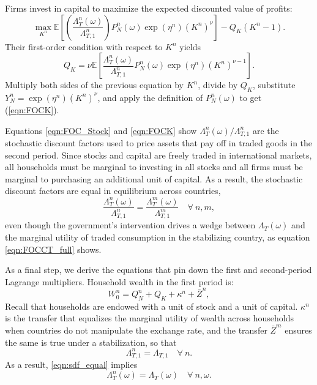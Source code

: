 Firms invest in capital to maximize the expected discounted value of
profits:
\begin{equation*}
  \max_{K^n} \mathbb{E}\left[ 
    \left( \frac{\Lambda^n_T(\omega)}{\Lambda^n_{T, 1}} \right) 
    P_N^n(\omega) \exp\left( \eta^n \right) \left( K^n \right)^{\nu} \right] - 
  Q_K \left( K^n - 1 \right).
\end{equation*}
Their first-order condition with respect to $K^n$
yields\begin{equation*} Q_K = \nu \mathbb{E}\left[
    \frac{\Lambda_T^n(\omega)}{\Lambda_{T, 1}^n} P^n_N(\omega)
    \exp\left( \eta^n \right) \left(K^n\right)^{\nu - 1} \right].
\end{equation*}
Multiply both sides of the previous equation by $K^n$, divide by
$Q_K$, substitute $Y_N^n = \exp(\eta^n) \left( K^n \right)^\nu$, and
apply the definition of $P^n_N(\omega)$ to get (\ref{eqn:FOCK}).

Equations \eqref{eqn:FOC_Stock} and \eqref{eqn:FOCK} show
$\Lambda^n_T(\omega) / \Lambda^n_{T, 1}$ are the stochastic discount
factors used to price assets that pay off in traded goods in the
second period. Since stocks and capital are freely traded in
international markets, all households must be marginal to investing in
all stocks and all firms must be marginal to purchasing an additional
unit of capital. As a result, the stochastic discount factors are
equal in equilibrium across countries,
\begin{equation}
  \frac{\Lambda^n_T(\omega)}{\Lambda^n_{T, 1}} = 
  \frac{\Lambda^m_T(\omega)}{\Lambda^m_{T, 1}} \quad
  \forall ~n, m,
  \label{eqn:sdf_equal}
\end{equation}
even though the government's intervention drives a wedge between
$\Lambda_T(\omega)$ and the marginal utility of traded consumption in
the stabilizing country, as equation \eqref{eqn:FOCCT_full} shows.

As a final step, we derive the equations that pin down the first and
second-period Lagrange multipliers. Household wealth in the first
period is:
\begin{equation*}
  W^n_0 = Q^n_N + Q_K + \kappa^n + \bar{Z}^n,
\end{equation*}
Recall that households are endowed with a unit of stock and a unit of
capital. $\kappa^n$ is the transfer that equalizes the marginal
utility of wealth across households when countries do not manipulate
the exchange rate, and the transfer $\bar{Z}^m$ ensures the same is
true under a stabilization, so that\begin{equation} \Lambda^{n}_{T, 1}
  = \Lambda^{}_{T, 1} \quad \forall ~n.
  \label{eqn:mult_equal}
\end{equation}
As a result, \eqref{eqn:sdf_equal} implies
\begin{equation*}
  \Lambda^n_T(\omega) = \Lambda_T(\omega)
  \quad \forall ~n, \omega.
\end{equation*}

